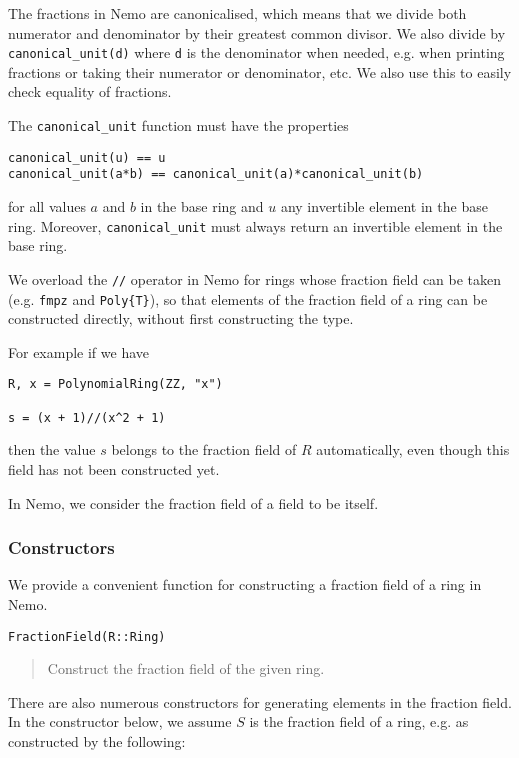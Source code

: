 \documentclass[a4paper,10pt]{article}
\newcommand{\code}{\lstinline}
\newcommand{\desc}[1]{\vspace{-3mm}\begin{quote}#1\end{quote}}
\begin{document}
The fractions in Nemo are canonicalised, which means that we divide both
numerator and denominator by their greatest common divisor. We also divide
by \code{canonical_unit(d)} where \code{d} is the denominator when needed,
e.g. when printing fractions or taking their numerator or denominator, etc.
We also use this to easily check equality of fractions.

The \code{canonical_unit} function must have the properties

\begin{lstlisting}
canonical_unit(u) == u
canonical_unit(a*b) == canonical_unit(a)*canonical_unit(b)
\end{lstlisting}

for all values $a$ and $b$ in the base ring and $u$ any invertible element in 
the base ring. Moreover, \code{canonical_unit} must always return an invertible
element in the base ring.

We overload the \code{//} operator in Nemo for rings whose fraction field can
be taken (e.g. \code{fmpz} and \code|Poly{T}|), so that elements of the
fraction field of a ring can be constructed directly, without first
constructing the type.

For example if we have

\begin{lstlisting}
R, x = PolynomialRing(ZZ, "x")

s = (x + 1)//(x^2 + 1)
\end{lstlisting}

then the value $s$ belongs to the fraction field of $R$ automatically, even
though this field has not been constructed yet.

In Nemo, we consider the fraction field of a field to be itself.

\subsubsection{Constructors}

We provide a convenient function for constructing a fraction field of a ring in
Nemo.

\begin{lstlisting}
FractionField(R::Ring)
\end{lstlisting}

\desc{Construct the fraction field of the given ring.}

There are also numerous constructors for generating elements in the fraction
field. In the constructor below, we assume $S$ is the fraction field of a ring,
e.g. as constructed by the following:
\end{document}
